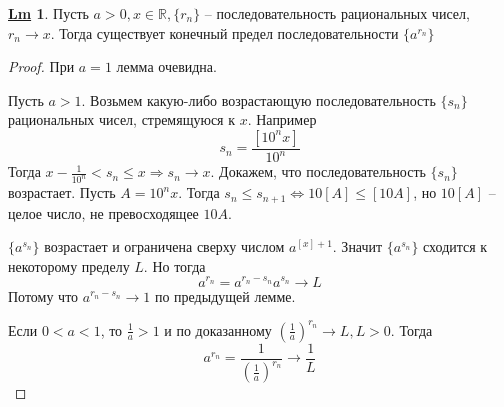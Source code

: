 \documentclass[12pt]{article}
\def\R{\mathbb{R}}       %
\def\SO{\Rightarrow}     %
\def\EQ{\Leftrightarrow} %
\theoremstyle{definition} %
\newtheorem{Lm}[Thm]{\underline{Lm}} %
\theoremstyle{plain} %
\theoremstyle{remark} %
\begin{document}
\begin{Lm}
    Пусть $a > 0, x \in \R, \{r_n\}$ -- последовательность рациональных чисел, $r_n \to x$. Тогда существует конечный предел последовательности $\{a^{r_n}\}$
\end{Lm}

\begin{proof}
    При $a = 1$ лемма очевидна. 
    
    Пусть $a > 1$. Возьмем какую-либо возрастающую последовательность $\{s_n\}$ рациональных чисел, стремящуюся к $x$. Например
    \[s_n = \frac{[10^n x]}{10^n}\]
    Тогда $x - \frac{1}{10^n} < s_n \leqslant x \SO s_n \to x$. Докажем, что последовательность $\{s_n\}$ возрастает. Пусть $A = 10^n x$.
    Тогда $s_n \leqslant s_{n + 1} \EQ 10[A] \leqslant [10A]$, но $10[A]$ -- целое число, не превосходящее $10A$.
    
    $\{a^{s_n}\}$ возрастает и ограничена сверху числом $a^{[x] + 1}$. Значит $\{a^{s_n}\}$ сходится к некоторому пределу $L$. Но тогда    
    \[a^{r_n} = a^{r_n - s_n}a^{s_n} \to L\]
    Потому что $a^{r_n - s_n} \to 1$ по предыдущей лемме.
    
    Если $0 < a < 1$, то $\frac{1}{a} > 1$ и по доказанному $\left(\frac{1}{a}\right)^{r_n} \to L, L > 0$. Тогда
    \[a^{r_n} = \frac{1}{\left(\frac{1}{a}\right)^{r_n}} \to \frac{1}{L}\]   
\end{proof}
\end{document}
